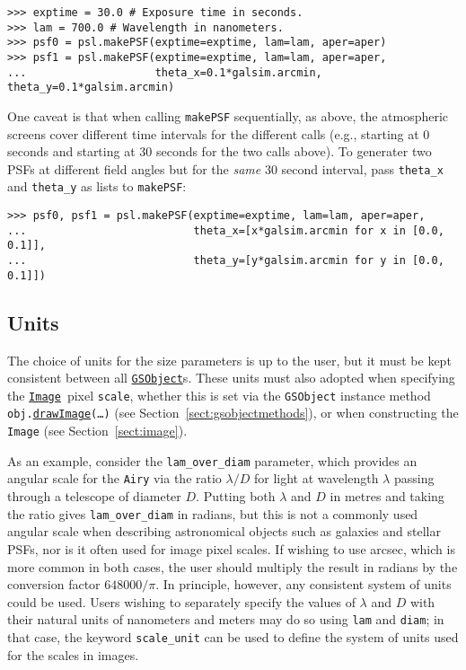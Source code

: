 \documentclass[preprint,10pt]{../../devel/modules/aastex}
\newcommand\GSObject{\href{http://galsim-developers.github.io/GalSim/classgalsim_1_1base_1_1_g_s_object.html}{\texttt{GSObject}}}
\newcommand\drawImage{\href{http://galsim-developers.github.io/GalSim/classgalsim_1_1base_1_1_g_s_object.html\#aafe6ca9d84fe81543fbc105b897273db}{\texttt{drawImage}}}
\newcommand\Image{\href{http://galsim-developers.github.io/GalSim/classgalsim_1_1image_1_1_image.html}{\texttt{Image}}}
\begin{document}
\begin{verbatim}
>>> exptime = 30.0 # Exposure time in seconds.
>>> lam = 700.0 # Wavelength in nanometers.
>>> psf0 = psl.makePSF(exptime=exptime, lam=lam, aper=aper)
>>> psf1 = psl.makePSF(exptime=exptime, lam=lam, aper=aper,
...                    theta_x=0.1*galsim.arcmin, theta_y=0.1*galsim.arcmin)
\end{verbatim}

One caveat is that when calling \texttt{makePSF} sequentially, as above, the atmospheric screens
cover different time intervals for the different calls (e.g., starting at 0 seconds and starting at
30 seconds for the two calls above). To generater two PSFs at different field angles but for the
\textit{same} 30 second interval, pass \texttt{theta\_x} and \texttt{theta\_y} as lists to
\texttt{makePSF}:

\begin{verbatim}
>>> psf0, psf1 = psl.makePSF(exptime=exptime, lam=lam, aper=aper,
...                          theta_x=[x*galsim.arcmin for x in [0.0, 0.1]],
...                          theta_y=[y*galsim.arcmin for y in [0.0, 0.1]])
\end{verbatim}

\subsection{Units}
The choice of units for the size parameters is up to the user,
but it must be kept consistent between all \GSObject s.  These
units must also adopted when specifying the \Image\ pixel
\texttt{scale}, whether this is set via the \texttt{GSObject}
instance method \texttt{obj.}\drawImage\texttt{(\dots)}
(see Section~\ref{sect:gsobjectmethods}),
or when constructing the \texttt{Image} (see Section~\ref{sect:image}).

As an example, consider the
\texttt{lam\_over\_diam} parameter, which provides an angular scale for
the \texttt{Airy} via
the ratio $\lambda / D$ for light at wavelength $\lambda$ passing
through a telescope of diameter $D$. Putting both $\lambda$ and
$D$ in metres and taking the ratio gives \texttt{lam\_over\_diam} in
radians, but this is not a commonly used angular scale when describing
astronomical objects such as galaxies and stellar PSFs, nor is
it often used for image pixel scales.  If wishing to use arcsec, which
is more common in both cases, the user should multiply the result in
radians by the conversion factor
$648000 / \pi$.  In principle, however, any consistent
system of units could be used.  Users wishing to separately specify the values of $\lambda$ and $D$
with their natural units of nanometers and meters may do so using \texttt{lam} and \texttt{diam}; in
that case, the keyword \texttt{scale\_unit} can be used to define the system of units used for the
scales in images.
\end{document}

